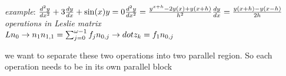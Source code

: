 \documentclass[10pt, AMS Euler]{article}
\begin{document}
\textit{example}: 
$
\frac{d^2 y}{dx^2} + 3 \frac{dy}{dx} + \sin(x)y = 0\\
\frac{d^2y}{dx^2} = \frac{y^{x+h} - 2y(x) + y(x + h)}{h^2}\\
\frac{dy}{dx} = \frac{y(x + h) - y(x - h)}{2h}
$\\


\textit{operations in Leslie matrix}\\
$
L n_0 \to n_1\\
n_{1,1} = \sum_{j=0}^{\omega - 1} f_j n_{0, j} \to dot\\
z_k = f_1 n_{0,j}\\
$

we want to separate these two operations into two parallel region. So each operation needs to be in its own parallel block
\end{document}
